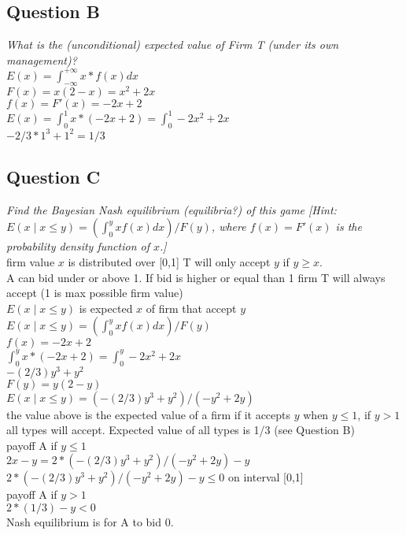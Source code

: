 \documentclass[12pt]{article}
\begin{document}
\begin{center}
\subsection{Question B}
\textit{What is the (unconditional) expected value of Firm T (under its own management)?} \\
$E(x)=\int^{+\infty}_{-\infty} x*f(x)dx$ \\
$F(x)=x(2-x)=x^2+2x$ \\
$f(x)=F'(x)=-2x+2$ \\
$E(x)=\int_{0}^{1} x*(-2x+2)=\int_{0}^{1} -2x^2+2x$ \\
$-2/3*1^3+1^2=1/3$ \\ 
\subsection{Question C}
\textit{Find the Bayesian Nash equilibrium (equilibria?) of this game [Hint: $E(x\mid x\leq y)=(\int_{0}^{y}xf(x)dx)/F(y)$, where $f(x)=F'(x)$ is the probability density function of $x$.]  \\}
\vspace{5mm}
firm value $x$ is distributed over [0,1] T will only accept $y$ if $y \geq x$. \\
A can bid under or above 1. If bid is higher or equal than 1 firm T will always accept (1 is max possible firm value) \\
$E(x\mid x\leq y)$ is expected $x$ of firm that accept $y$ \\
\vspace{5mm}
$E(x\mid x\leq y)=(\int_{0}^{y}xf(x)dx)/F(y)$ \\
$f(x)=-2x+2$ \\
$\int_{0}^{y}x*(-2x+2)=\int_{0}^{y}-2x^2+2x$ \\
$-(2/3)y^3+y^2$ \\
$F(y)=y(2-y)$ \\
$E(x\mid x\leq y)= (-(2/3)y^3+y^2)/(-y^2+2y)$ \\
\vspace{5mm}
the value above is the expected value of a firm if it accepts $y$ when $y \leq 1$, if $y > 1$ all types will accept. Expected value of all types is 1/3 (see Question B) \\
\vspace{5mm}
payoff A if $y \leq 1$ \\ $2x-y=2*(-(2/3)y^3+y^2)/(-y^2+2y)-y$ \\
$2*(-(2/3)y^3+y^2)/(-y^2+2y)-y \leq 0$ on interval [0,1] \\ 
\vspace{5mm}
payoff A if $y>1$ \\
$2*(1/3)-y<0$ \\
\vspace{5mm}
Nash equilibrium is for A to bid 0. \\
\end{center}
\end{document}
